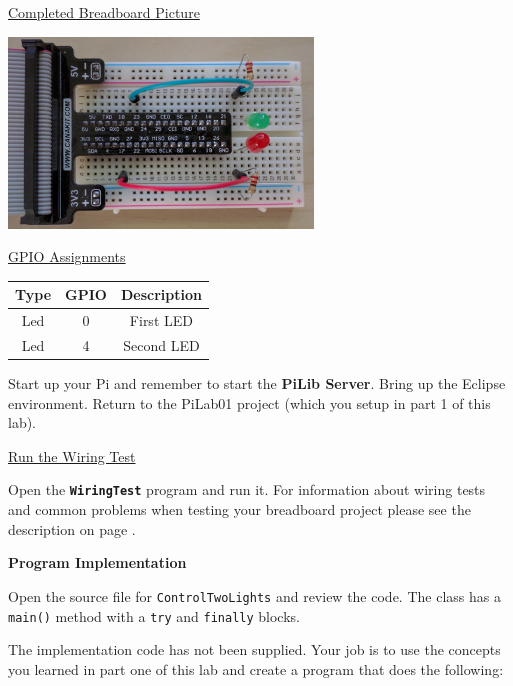 \underline{Completed Breadboard Picture}

\beforefig
\centerline{\includegraphics[height=2in]{pi_images/lab01images/PiLab01-2Light-photo.jpg}}
\afterfig

\underline{GPIO Assignments}

\begin{center}
	\begin{tabular}{c | c | c}
		\hline
		\textbf{Type} & \textbf{GPIO} & \textbf{Description} \\ \hline
		Led & 0 & First LED \\ 
		\hline
		Led & 4 & Second LED \\ 
		\hline	
	\end{tabular}
\end{center}

\vspace{10pt}

Start up your Pi and remember to start the \textbf{PiLib Server}.  Bring up the Eclipse environment. Return to the PiLab01 project (which you setup in part 1 of this lab).

\underline{Run the Wiring Test}

Open the \textbf{\texttt{WiringTest}} program and run it. For information about wiring tests and common problems when testing your breadboard project please see the description on page \pageref{wiringTestDescription}.

\textbf{Program Implementation}

Open the source file for \texttt{ControlTwoLights} and review the code. The class has a \texttt{main()} method with a \texttt{try} and \texttt{finally} blocks. 

The implementation code has not been supplied. Your job is to use the concepts you learned in part one of this lab and create a program that does the following:

